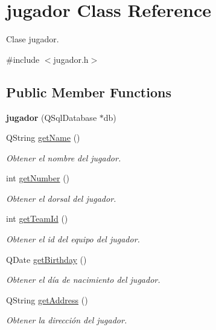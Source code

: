 \hypertarget{classjugador}{}\section{jugador Class Reference}
\label{classjugador}


Clase jugador.  




{\ttfamily \#include $<$jugador.\+h$>$}

\subsection*{Public Member Functions}
\begin{DoxyCompactItemize}
\item 
\mbox{\label{classjugador_aae9e23fa217d96f75c9e214e877a6622}} 
{\bfseries jugador} (Q\+Sql\+Database $\ast$db)
\item 
Q\+String \mbox{\hyperlink{classjugador_adc3df126f15f2bb2aec01cc04145ae14}{get\+Name}} ()
\begin{DoxyCompactList}\small\item\em Obtener el nombre del jugador. \end{DoxyCompactList}\item 
int \mbox{\hyperlink{classjugador_ad1b16c02d5c0ec28e2a7db3ac0a09cda}{get\+Number}} ()
\begin{DoxyCompactList}\small\item\em Obtener el dorsal del jugador. \end{DoxyCompactList}\item 
int \mbox{\hyperlink{classjugador_a188b5459eed3f7f09b49232d0d674050}{get\+Team\+Id}} ()
\begin{DoxyCompactList}\small\item\em Obtener el id del equipo del jugador. \end{DoxyCompactList}\item 
Q\+Date \mbox{\hyperlink{classjugador_a845558cf9e7def7add1d73e9b6812865}{get\+Birthday}} ()
\begin{DoxyCompactList}\small\item\em Obtener el día de nacimiento del jugador. \end{DoxyCompactList}\item 
Q\+String \mbox{\hyperlink{classjugador_adb7342524d07d6708414942a82cfa514}{get\+Address}} ()
\begin{DoxyCompactList}\small\item\em Obtener la dirección del jugador. \end{DoxyCompactList}\item 

\end{DoxyCompactItemize}

